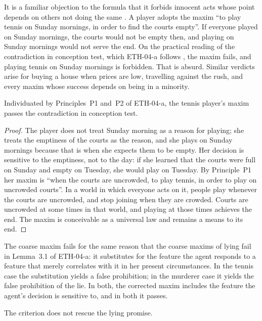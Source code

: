 \documentclass{situationist-preprint}
\begin{document}
It is a familiar objection to the formula that it forbids innocent acts whose point depends on others not doing the same \citep{Herman1993,Parfit2011}. A player adopts the maxim \enquote{to play tennis on Sunday mornings, in order to find the courts empty}. If everyone played on Sunday mornings, the courts would not be empty then, and playing on Sunday mornings would not serve the end. On the practical reading of the contradiction in conception test, which ETH-04-a follows \citep{Korsgaard1985}, the maxim fails, and playing tennis on Sunday mornings is forbidden. That is absurd. Similar verdicts arise for buying a house when prices are low, travelling against the rush, and every maxim whose success depends on being in a minority.

\begin{proposition}\label{p:coord}
Individuated by Principles~P1 and~P2 of ETH-04-a, the tennis player's maxim passes the contradiction in conception test.
\end{proposition}

\begin{proof}
The player does not treat Sunday morning as a reason for playing; she treats the emptiness of the courts as the reason, and she plays on Sunday mornings because that is when she expects them to be empty. Her decision is sensitive to the emptiness, not to the day: if she learned that the courts were full on Sunday and empty on Tuesday, she would play on Tuesday. By Principle~P1 her maxim is \enquote{when the courts are uncrowded, to play tennis, in order to play on uncrowded courts}. In a world in which everyone acts on it, people play whenever the courts are uncrowded, and stop joining when they are crowded. Courts are uncrowded at some times in that world, and playing at those times achieves the end. The maxim is conceivable as a universal law and remains a means to its end.
\end{proof}

The coarse maxim fails for the same reason that the coarse maxims of lying fail in Lemma~3.1 of ETH-04-a: it substitutes for the feature the agent responds to a feature that merely correlates with it in her present circumstances. In the tennis case the substitution yields a false prohibition; in the murderer case it yields the false prohibition of the lie. In both, the corrected maxim includes the feature the agent's decision is sensitive to, and in both it passes.

\begin{proposition}\label{p:promise}
The criterion does not rescue the lying promise.
\end{proposition}
\end{document}
